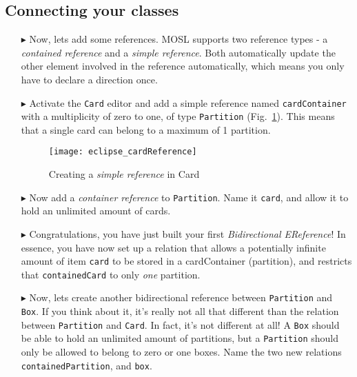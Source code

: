 \newpage
\subsection{Connecting your classes}
\texHeader
\hypertarget{static:references tex}{}

\begin{itemize}

\item[$\blacktriangleright$] Now, lets add some references. MOSL supports two reference types - a \emph{contained reference} and a \emph{simple reference}. Both
automatically update the other element involved in the reference automatically, which means you only have to declare a direction once.

\item[$\blacktriangleright$] Activate the \texttt{Card} editor and add a simple reference named \texttt{cardContainer} with a multiplicity of zero to one, of
type \texttt{Partition} (Fig.~\ref{fig:cardReference}). This means that a single card can belong to a maximum of 1 partition.

\begin{figure}[htbp]
	\centering
  \texttt{[image: eclipse\_cardReference]}
	\caption{Creating a \emph{simple reference} in Card}
	\label{fig:cardReference}
\end{figure} 

\item[$\blacktriangleright$] Now add a \emph{container reference} to \texttt{Partition}. Name it \texttt{card}, and allow it to hold an unlimited amount of
cards.

\item[$\blacktriangleright$] Congratulations, you have just built your first \emph{Bidirectional EReference}! In essence, you have now set up a relation that
allows a potentially infinite amount of item \texttt{card} to be stored in a cardContainer (partition), and restricts that \texttt{containedCard} to only
\emph{one} partition.

\item[$\blacktriangleright$] Now, lets create another bidirectional reference between \texttt{Partition} and \texttt{Box}. If you think about it, it's really
not all that different than the relation between \texttt{Partition} and \texttt{Card}. In fact, it's not different at all! A \texttt{Box} should be able to hold
an unlimited amount of partitions, but a \texttt{Partition} should only be allowed to belong to zero or one boxes. Name the two new relations
\texttt{containedPartition}, and \texttt{box}.


\end{itemize}
